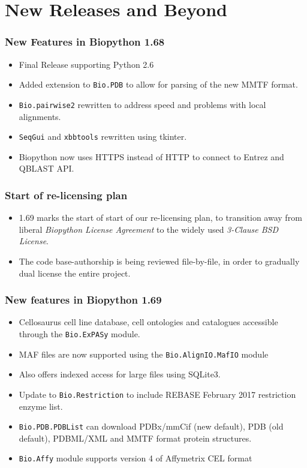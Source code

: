 \documentclass[trans]{beamer}
\begin{document}

\section{New Releases and Beyond}
\frame
{
}
\frame
{
  \frametitle{New Features in Biopython 1.68}

  \begin{itemize}
  \item Final Release supporting Python 2.6
  \item Added extension to \texttt{Bio.PDB} to allow for parsing of the new MMTF format.
  \item \texttt{Bio.pairwise2} rewritten to address speed and problems with local alignments.
  \item \texttt{SeqGui} and \texttt{xbbtools} rewritten using tkinter.
  \item Biopython now uses HTTPS instead of HTTP to connect to Entrez and QBLAST API.
  \end{itemize}

}
\frame
{
}
\frame
{
  \frametitle{Start of re-licensing plan}

  \begin{itemize}
  \item 1.69 marks the start of start of our re-licensing plan, to transition away
from liberal \emph{Biopython License Agreement} to the widely used \emph{3-Clause BSD License}.
\item The code base-authorship is being reviewed file-by-file, in order to gradually dual license the entire
project.
  \end{itemize}

}
\frame
{
  \frametitle{New features in Biopython 1.69}
  \begin{itemize}
  \item Cellosaurus cell line database, cell ontologies and catalogues accessible through the \texttt{Bio.ExPASy} module.
  \item MAF files are now supported using the \texttt{Bio.AlignIO.MafIO} module
  \item Also offers indexed access for large files using SQLite3.
  \item Update to \texttt{Bio.Restriction} to include REBASE February 2017 restriction enzyme list.
  \item \texttt{Bio.PDB.PDBList} can download PDBx/mmCif (new default), PDB (old default), PDBML/XML and MMTF format protein structures.
  \item \texttt{Bio.Affy} module supports version 4 of Affymetrix CEL format
  \end{itemize}

}
\end{document}
